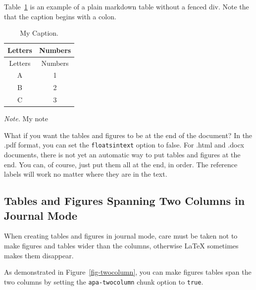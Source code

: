 \documentclass[
  jou,
  floatsintext,
  longtable,
  nolmodern,
  notxfonts,
  notimes,
  colorlinks=true,linkcolor=blue,citecolor=blue,urlcolor=blue]{apa7}
\begin{document}
Table~\ref{tbl-mymarkdowntable2} is an example of a plain markdown table
without a fenced div. Note the that the caption begins with a colon.

\begin{ThreePartTable}

\begin{longtable}[]{@{}cc@{}}
\caption{My Caption.}\label{tbl-mymarkdowntable2}\tabularnewline
\toprule\noalign{}
Letters & Numbers \\
\midrule\noalign{}
\endfirsthead
\toprule\noalign{}
Letters & Numbers \\
\midrule\noalign{}
\endhead
\bottomrule\noalign{}
\endlastfoot
A & 1 \\
B & 2 \\
C & 3 \\
\end{longtable}

{\noindent \emph{Note.} My note}

\end{ThreePartTable}

What if you want the tables and figures to be at the end of the
document? In the .pdf format, you can set the \texttt{floatsintext}
option to false. For .html and .docx documents, there is not yet an
automatic way to put tables and figures at the end. You can, of course,
just put them all at the end, in order. The reference labels will work
no matter where they are in the text.

\subsection{Tables and Figures Spanning Two Columns in Journal
Mode}\label{tables-and-figures-spanning-two-columns-in-journal-mode}

When creating tables and figures in journal mode, care must be taken not
to make figures and tables wider than the columns, otherwise \LaTeX
sometimes makes them disappear.

As demonstrated in Figure~\ref{fig-twocolumn}, you can make figures
tables span the two columns by setting the \texttt{apa-twocolumn} chunk
option to \texttt{true}.
\end{document}
